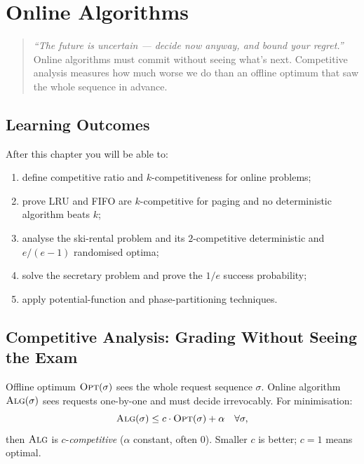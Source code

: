 \chapter{Online Algorithms}
\label{ch:online}

\begin{quote}
\emph{``The future is uncertain --- decide now anyway, and bound your regret.''}
Online algorithms must commit without seeing what's next. Competitive analysis measures how much worse we do than an offline optimum that saw the whole sequence in advance.
\end{quote}

\noindent{}
\vspace{0.4em}

\section*{Learning Outcomes}
After this chapter you will be able to:
\begin{enumerate}[label=(L\arabic*)]
    \item define competitive ratio and $k$-competitiveness for online problems;
    \item prove LRU and FIFO are $k$-competitive for paging and no deterministic algorithm beats $k$;
    \item analyse the ski-rental problem and its $2$-competitive deterministic and $e/(e-1)$ randomised optima;
    \item solve the secretary problem and prove the $1/e$ success probability;
    \item apply potential-function and phase-partitioning techniques.
\end{enumerate}

\section{Competitive Analysis: Grading Without Seeing the Exam}
\label{sec:competitive}

Offline optimum $\textsc{Opt}(\sigma)$ sees the whole request sequence $\sigma$. Online algorithm $\textsc{Alg}(\sigma)$ sees requests one-by-one and must decide irrevocably. For minimisation:
\[
\textsc{Alg}(\sigma)\le c\cdot\textsc{Opt}(\sigma)+\alpha\quad\forall\sigma,
\]
then $\textsc{Alg}$ is $c$-\emph{competitive} ($\alpha$ constant, often $0$). Smaller $c$ is better; $c=1$ means optimal.

